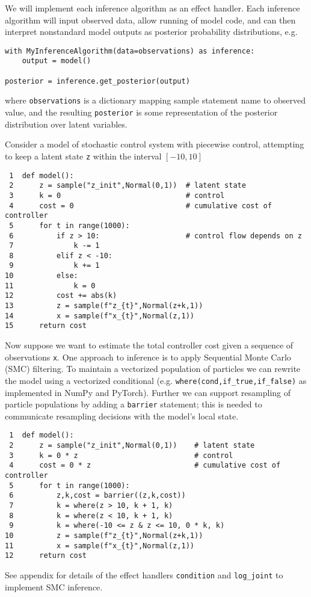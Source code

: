 \documentclass[anonymous=false, %
               format=acmsmall, %
               review=true, %
               screen=true, %
               nonacm=true]{acmart}
\begin{document}
We will implement each inference algorithm as an effect handler.
Each inference algorithm will input observed data, allow running of model code, and can then interpret nonstandard model outputs as posterior probability distributions, e.g.
\begin{verbatim}
with MyInferenceAlgorithm(data=observations) as inference:
    output = model()

posterior = inference.get_posterior(output)
\end{verbatim}
where \verb$observations$ is a dictionary mapping sample statement name to observed value, and the resulting \verb$posterior$ is some representation of the posterior distribution over latent variables.

Consider a model of stochastic control system with piecewise control, attempting to keep a latent state \verb$z$ within the interval $[-10,10]$
\begin{verbatim}
 1  def model():
 2      z = sample("z_init",Normal(0,1))  # latent state
 3      k = 0                             # control
 4      cost = 0                          # cumulative cost of controller
 5      for t in range(1000):
 6          if z > 10:                    # control flow depends on z
 7              k -= 1
 8          elif z < -10:
 9              k += 1
10          else:
11              k = 0
12          cost += abs(k)
13          z = sample(f"z_{t}",Normal(z+k,1))
14          x = sample(f"x_{t}",Normal(z,1))
15      return cost
\end{verbatim}
Now suppose we want to estimate the total controller cost given a sequence of observations \verb$x$.
One approach to inference is to apply Sequential Monte Carlo (SMC) filtering.
To maintain a vectorized population of particles we can rewrite the model using a vectorized conditional (e.g. \verb$where(cond,if_true,if_false)$ as implemented in NumPy and PyTorch).
Further we can support resampling of particle populations by adding a \verb$barrier$ statement; this is needed to communicate resampling decisions with the model's local state.
\begin{verbatim}
 1  def model():
 2      z = sample("z_init",Normal(0,1))    # latent state
 3      k = 0 * z                           # control
 4      cost = 0 * z                        # cumulative cost of controller
 5      for t in range(1000):
 6          z,k,cost = barrier((z,k,cost))
 7          k = where(z > 10, k + 1, k)
 8          k = where(z < 10, k + 1, k)
 9          k = where(-10 <= z & z <= 10, 0 * k, k)
10          z = sample(f"z_{t}",Normal(z+k,1))
11          x = sample(f"x_{t}",Normal(z,1))
12      return cost
\end{verbatim}
See appendix \label{sec:appendix:smc} for details of the effect handlers \verb$condition$ and \verb$log_joint$ to implement SMC inference.
\end{document}
